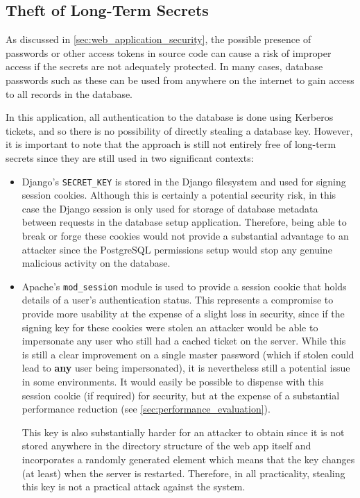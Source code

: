 \documentclass[12pt]{report}
\begin{document}
\subsection{Theft of Long-Term Secrets}
As discussed in \autoref{sec:web_application_security}, the possible presence of passwords or other access tokens in source code can cause a risk of improper access if the secrets are not adequately protected. In many cases, database passwords such as these can be used from anywhere on the internet to gain access to all records in the database.

In this application, all authentication to the database is done using Kerberos tickets, and so there is no possibility of directly stealing a database key. However, it is important to note that the approach is still not entirely free of long-term secrets since they are still used in two significant contexts:
\begin{itemize}
\item
  Django's \verb+SECRET_KEY+ is stored in the Django filesystem and used for signing session cookies. Although this is certainly a potential security risk, in this case the Django session is only used for storage of database metadata between requests in the database setup application. Therefore, being able to break or forge these cookies would not provide a substantial advantage to an attacker since the PostgreSQL permissions setup would stop any genuine malicious activity on the database.
\item
  Apache's \verb+mod_session+ module is used to provide a session cookie that holds details of a user's authentication status. This represents a compromise to provide more usability at the expense of a slight loss in security, since if the signing key for these cookies were stolen an attacker would be able to impersonate any user who still had a cached ticket on the server. While this is still a clear improvement on a single master password (which if stolen could lead to \textbf{any} user being impersonated), it is nevertheless still a potential issue in some environments. It would easily be possible to dispense with this session cookie (if required) for security, but at the expense of a substantial performance reduction (see \autoref{sec:performance_evaluation}).

  This key is also substantially harder for an attacker to obtain since it is not stored anywhere in the directory structure of the web app itself and incorporates a randomly generated element which means that the key changes (at least) when the server is restarted. Therefore, in all practicality, stealing this key is not a practical attack against the system.
\end{itemize}
\end{document}
